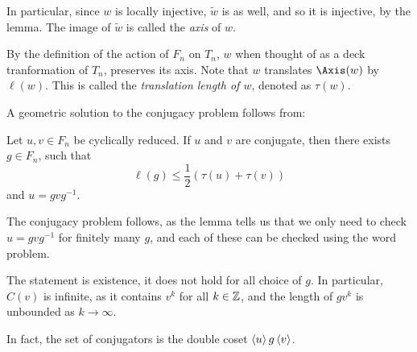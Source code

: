 \documentclass{article}
\begin{document}
In particular, since \(w\) is locally injective, \(\widetilde w\) is as well, and so it is injective, by the lemma. The image of \(\widetilde w\) is called the \emph{axis} of \(w\).

By the definition of the action of \(F_n\) on \(T_n\), \(w\) when thought of as a deck tranformation of \(T_n\), preserves its axis. Note that \(w\) translates \(\Axis(w)\) by \(\ell(w)\). This is called the \emph{translation length of \(w\)}, denoted as \(\tau(w)\).

\lec

A geometric solution to the conjugacy problem follows from:

\begin{lemma}
    Let \(u, v \in F_n\) be cyclically reduced. If \(u\) and \(v\) are conjugate, then there exists \(g \in F_n\), such that
    \[\ell(g) \le \frac{1}{2}\left(\tau(u) + \tau(v)\right)\]
    and \(u = gvg^{-1}\).
\end{lemma}

The conjugacy problem follows, as the lemma tells us that we only need to check \(u = gvg^{-1}\) for finitely many \(g\), and each of these can be checked using the word problem.

\begin{remark}
    The statement is existence, it does not hold for all choice of \(g\). In particular, \(C(v)\) is infinite, as it contains \(v^k\) for all \(k \in \mathbb{Z}\), and the length of \(gv^k\) is unbounded as \(k \to \infty\).

    In fact, the set of conjugators is the double coset \(\left\langle u \right\rangle g\left\langle v \right\rangle\).
\end{remark}
\end{document}
